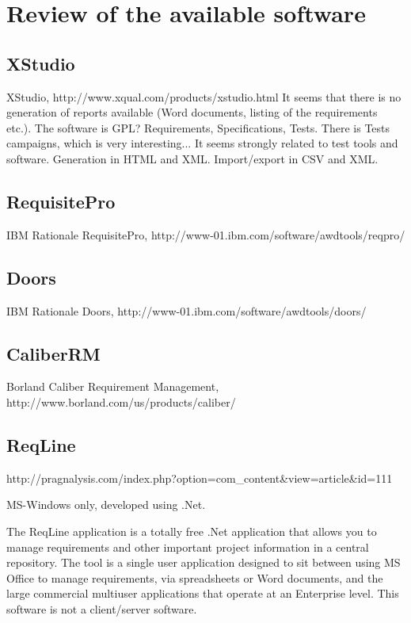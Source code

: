 \documentclass{llncs}
\begin{document}
\section{Review of the available software}

\subsection{XStudio}
XStudio, http://www.xqual.com/products/xstudio.html
It seems that there is no generation of reports available (Word documents, listing of the requirements etc.).
The software is GPL?
Requirements, Specifications, Tests.
There is Tests campaigns, which is very interesting...
It seems strongly related to test tools and software.
Generation in HTML and XML.
Import/export in CSV and XML.

\subsection{RequisitePro}

IBM Rationale RequisitePro, http://www-01.ibm.com/software/awdtools/reqpro/

\subsection{Doors}

IBM Rationale Doors, http://www-01.ibm.com/software/awdtools/doors/

\subsection{CaliberRM}

Borland Caliber Requirement Management, http://www.borland.com/us/products/caliber/

\subsection{ReqLine}

http://pragnalysis.com/index.php?option=com\_content\&view=article\&id=111

MS-Windows only, developed using .Net.

The ReqLine application is a totally free .Net application that allows you to manage requirements and other important project information in a central repository. The tool is a single user application designed to sit between using MS Office to manage requirements, via spreadsheets or Word documents, and the large commercial multiuser applications that operate at an Enterprise level. This software is not a client/server software. 
\end{document}
